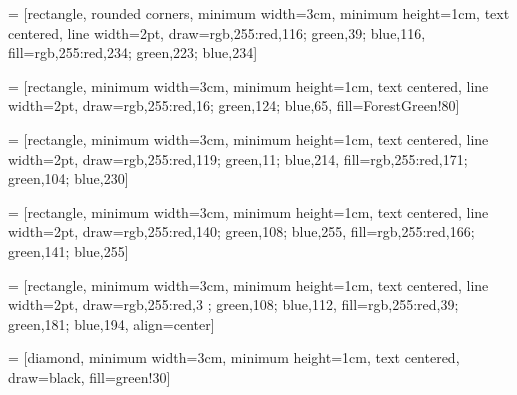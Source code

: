{} = [rectangle, rounded corners, minimum width=3cm, minimum height=1cm, text centered, line width=2pt, draw={rgb,255:red,116; green,39; blue,116}, fill={rgb,255:red,234; green,223; blue,234}]

 = [rectangle, minimum width=3cm, minimum height=1cm, text centered, line width=2pt, draw={rgb,255:red,16; green,124; blue,65}, fill=ForestGreen!80]

 = [rectangle, minimum width=3cm, minimum height=1cm, text centered, line width=2pt, draw={rgb,255:red,119; green,11; blue,214}, fill={rgb,255:red,171; green,104; blue,230}]

 = [rectangle, minimum width=3cm, minimum height=1cm, text centered, line width=2pt, draw={rgb,255:red,140; green,108; blue,255}, fill={rgb,255:red,166; green,141; blue,255}]

 = [rectangle, minimum width=3cm, minimum height=1cm, text centered, line width=2pt, draw={rgb,255:red,3 ; green,108; blue,112}, fill={rgb,255:red,39; green,181; blue,194}, align=center]

 = [diamond, minimum width=3cm, minimum height=1cm, text centered, draw=black, fill=green!30]

